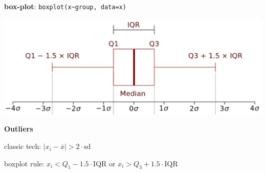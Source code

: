 \documentclass[9pt,landscape]{article}
\begin{document}
\begin{multicols}{3}
\textbf{box-plot}: \texttt{boxplot(x\textasciitilde group, data=x)}

\includegraphics[width=0.7\columnwidth]{imgs/boxplot}

\textbf{Outliers}

classic tech: $|x_i-\overline{x}|>2\cdot\mathrm{sd}$

boxplot rule: $x_i<Q_1-1.5\cdot\mathrm{IQR}$ or $x_i > Q_3+1.5\cdot\mathrm{IQR}$

\end{multicols}
\end{document}
